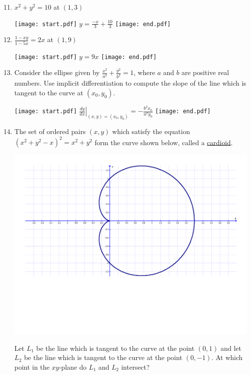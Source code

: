 \documentclass[12pt]{article}
\begin{document}

\begin{enumerate}
\setcounter{enumi}{10}

\item $x^2+y^2 = 10$ at $(1,3)$ 

\texttt{[image: start.pdf]}
{{$y=\frac{-x}{3}+\frac{10}{3}$}}
\texttt{[image: end.pdf]}


\item $\frac{1-xy}{1-5x}=2x$ at $(1,9)$ 

\texttt{[image: start.pdf]}
{{$y=9x$}}
\texttt{[image: end.pdf]}


\item Consider the ellipse given by $\frac{x^2}{a^2}+\frac{y^2}{b^2}=1$, where $a$ and $b$ are positive real numbers.  Use implicit differentiation to compute the slope of the line which is tangent to the curve at $(x_0,y_0)$.

\texttt{[image: start.pdf]}
{{$\left.\frac{dy}{dx}\right|_{(x,y)=(x_0,y_0)}=-\frac{b^2x_0}{a^2y_0}$}}
\texttt{[image: end.pdf]}


\item The set of ordered pairs $(x,y)$ which satisfy the equation $(x^2+y^2-x)^2=x^2+y^2$ form the curve shown below, called a \underline{cardioid}.

\begin{center}
\includegraphics[scale=0.5]{cardioid.pdf}
\end{center}

Let $L_1$ be the line which is tangent to the curve at the point $(0,1)$ and let $L_2$ be the line which is tangent to the curve at the point $(0,-1)$.  At which point in the $xy$-plane do $L_1$ and $L_2$ intersect?


\end{enumerate}
\end{document}
